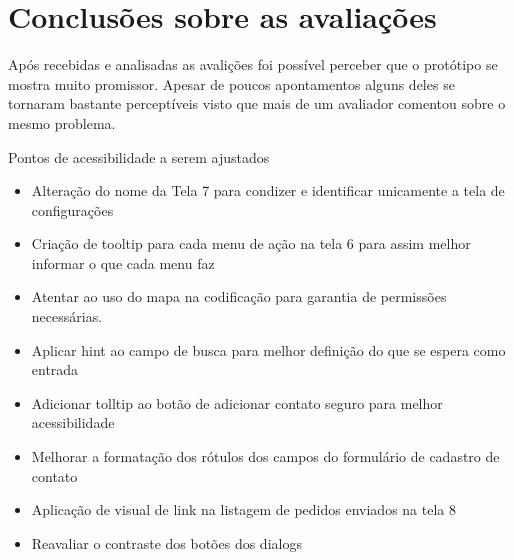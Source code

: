 \section{Conclusões sobre as avaliações}
Após recebidas e analisadas as avalições foi possível perceber que o protótipo se mostra muito promissor. Apesar de poucos apontamentos alguns deles se tornaram bastante perceptíveis visto que mais de um avaliador comentou sobre o mesmo problema. 

Pontos de acessibilidade a serem ajustados
\begin{itemize}
\item Alteração do nome da Tela 7 para condizer e identificar unicamente a tela de configurações
\item Criação de tooltip para cada menu de ação na tela 6 para assim melhor informar o que cada menu faz
\item Atentar ao uso do mapa na codificação para garantia de permissões necessárias.
\item Aplicar hint ao campo de busca para melhor definição do que se espera como entrada
\item Adicionar tolltip ao botão de adicionar contato seguro para melhor acessibilidade
\item Melhorar a formatação dos rótulos dos campos do formulário de cadastro de contato
\item Aplicação de visual de link na listagem de pedidos enviados na tela 8
\item Reavaliar o contraste dos botões dos dialogs
\end{itemize}

